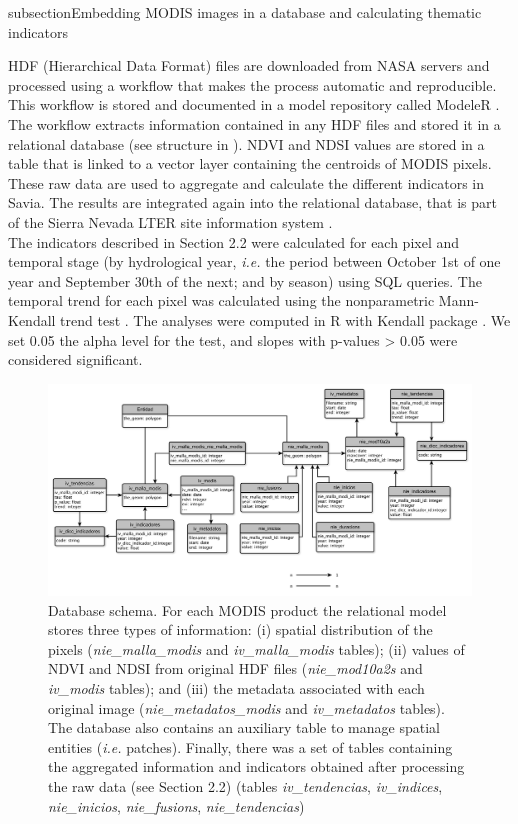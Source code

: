 subsection{Embedding MODIS images in a database and calculating thematic indicators}\label{sec:onto:Embedding}

HDF (Hierarchical Data Format) files are downloaded from NASA servers and processed using a workflow that makes the process automatic and reproducible. This workflow is stored and documented in a model repository called ModeleR \autocite{Bonetetal2014DocumentingStoring,PerezPerezetal2012ModeleREnviromental}. The workflow extracts information contained in any HDF files and stored it in a relational database (see structure in ). NDVI and NDSI values are stored in a table that is linked to a vector layer containing the centroids of MODIS pixels. These raw data are used to aggregate and calculate the different indicators in Savia. The results are integrated again into the relational database, that is part of the Sierra Nevada LTER site information system \autocite{BonetGarciaetal2011SierraNevada}.\\
The indicators described in Section 2.2 were calculated for each pixel and temporal stage (by hydrological year, \emph{i.e.} the period between October 1st of one year and September 30th of the next; and by season) using SQL queries. The temporal trend for each pixel was calculated using the nonparametric Mann-Kendall trend test \autocite{Kendall1970RankCorrelation,Mann1945NonparametricTests}. The analyses were computed in R \autocite{RCoreTeam2013LanguageEnvironment} with Kendall package \autocite{McLeod2011KendallKendall}. We set 0.05 the alpha level for the test, and slopes with p-values \textgreater{} 0.05 were considered significant.

\begin{figure}
\centering
\includegraphics[]{img/onto/onto-database}\caption{Database schema. For each MODIS product the relational model stores three types of information: (i) spatial distribution of the pixels (\emph{nie\_malla\_modis} and \emph{iv\_malla\_modis} tables); (ii) values of NDVI and NDSI from original HDF files (\emph{nie\_mod10a2s} and \emph{iv\_modis} tables); and (iii) the metadata associated with each original image (\emph{nie\_metadatos\_modis} and \emph{iv\_metadatos} tables). The database also contains an auxiliary table to manage spatial entities (\emph{i.e.} \Qpy patches). Finally, there was a set of tables containing the aggregated information and indicators obtained after processing the raw data (see Section 2.2) (tables \emph{iv\_tendencias}, \emph{iv\_indices}, \emph{nie\_inicios}, \emph{nie\_fusions}, \emph{nie\_tendencias})}\label{fig:database}
\end{figure}

